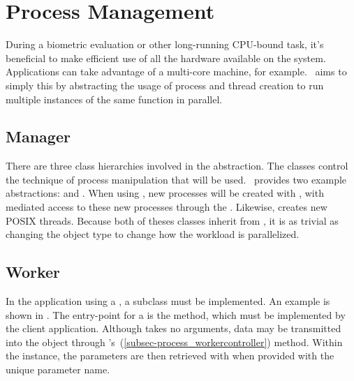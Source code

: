 \section{Process Management}
\label{sec-process_management}

During a biometric evaluation or other long-running CPU-bound task, it's 
beneficial to make efficient use of all the hardware available on the system.
Applications can take advantage of a multi-core machine, for example.
\sname\ aims to simply this by abstracting the usage of process and thread
creation to run multiple instances of the same function in parallel.

\subsection{Manager}
\label{subsec-process_manager}

There are three class hierarchies involved in the abstraction.  
The  classes control the
technique of process manipulation that will be used.  \sname\ provides two
example abstractions:  and
.  When
using , new processes will be created with 
, with mediated access to these new processes through the
.  Likewise, 
creates new POSIX threads.  Because both of theses classes inherit from
, it is as trivial as changing the  object type
to change how the workload is parallelized.

\subsection{Worker}
\label{subsec-process_worker}

In the application using a , a  subclass must be
implemented.  An example  is shown in
.
The entry-point for a  is the 
method, which must be implemented by the client application.  Although
 takes no arguments, data may be transmitted
into the object through
's~(\ref{subsec-process_workercontroller})
 method.  Within the  instance,
the parameters are then retrieved with  when
provided with the unique parameter name.

